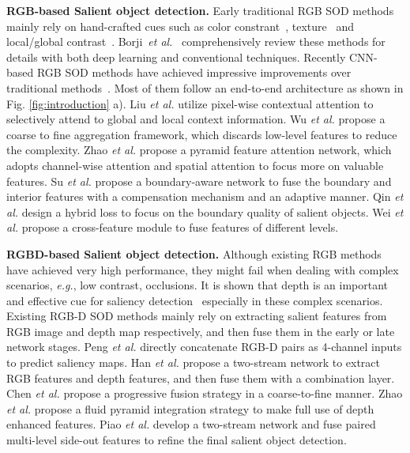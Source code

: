 \documentclass[sigconf]{acmart}
\def\eg{{\em e.g.}}
\def\etal{{\em et al.}}
\newcommand{\figref}[1]{Fig. \ref{#1}}
\begin{document}
\textbf{RGB-based Salient object detection.}
Early traditional RGB SOD methods mainly rely on hand-crafted cues such as color constrant~\cite{cheng2014global}, texture~\cite{yan2013hierarchical} and local/global contrast~\cite{klein2011center}. Borji~\etal~\cite{borji2015salient} comprehensively review these methods for details with both deep learning and conventional techniques.
Recently CNN-based RGB SOD methods have achieved impressive improvements over traditional methods~\cite{cheng2014global,yan2013hierarchical,klein2011center}. Most of them follow an end-to-end architecture as shown in \figref{fig:introduction} a). Liu \etal{} \cite{liu2018picanet} utilize pixel-wise contextual attention to selectively attend to global and local context information. Wu \etal{} \cite{wu2019cascaded} propose a coarse to fine aggregation framework, which discards low-level features to reduce the complexity. Zhao \etal{} \cite{zhao2019pyramid} propose a pyramid feature attention network, which adopts channel-wise attention and spatial attention to focus more on valuable features. Su \etal \cite{su2019selectivity} propose a boundary-aware network to fuse the boundary and interior features with a compensation mechanism and an adaptive manner. Qin \etal \cite{qin2019basnet} design a hybrid loss to focus on the boundary quality of salient objects. Wei \etal \cite{F3Net} propose a cross-feature module to fuse features of different levels.

\textbf{RGBD-based Salient object detection.}
Although existing RGB methods have achieved very high performance, they might fail when dealing with complex scenarios, \eg, low contrast, occlusions. It is shown that depth is an important and effective cue for saliency detection~\cite{desingh2013depth} especially in these complex scenarios.
Existing RGB-D SOD methods mainly rely on extracting salient features from RGB image and depth map respectively, and then fuse them in the early or late network stages. Peng \etal{} \cite{peng2014rgbd} directly concatenate RGB-D pairs as 4-channel inputs to predict saliency maps. Han \etal{} \cite{han2017cnns} propose a two-stream network to extract RGB features and depth features, and then fuse them with a combination layer. Chen \etal{} \cite{chen2018progressively} propose a progressive fusion strategy in a coarse-to-fine manner. Zhao \etal{} \cite{zhao2019pyramid} propose a fluid pyramid integration strategy to make full use of depth enhanced features. Piao \etal{} \cite{piao2019depth} develop a two-stream network and fuse paired multi-level side-out features to refine the final salient object detection. 
\end{document}
